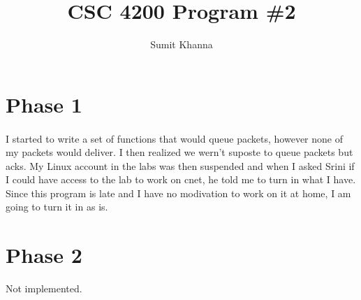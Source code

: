 \documentclass[a4paper,11pt]{article}
\author{Sumit Khanna}
\title{CSC 4200 Program \#2}
\begin{document}
\maketitle
\section{Phase 1}
\paragraph{}I started to write a set of functions that would queue packets, however none of my packets would deliver. I then realized we wern't suposte to queue packets but acks. My Linux account in the labs was then suspended and when I asked Srini if I could have access to the lab to work on cnet, he told me to turn in what I have. Since this program is late and I have no modivation to work on it at home, I am going to turn it in as is.

\section{Phase 2}Not implemented.
\end{document}
